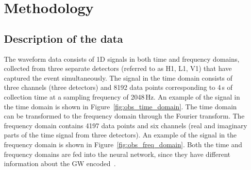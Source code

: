 \section{Methodology}
\label{sec:methodology}


\subsection{Description of the data}

The waveform data consists of 1D signals in both time and frequency domains, collected from three separate detectors (referred to as H1, L1, V1) that have captured the event simultaneously. The signal in the time domain consists of three channels (three detectors) and 8192 data points corresponding to 4\,s of collection time at a sampling frequency of 2048\,Hz. An example of the signal in the time domain is shown in Figure~\ref{fig:obs_time_domain}. The time domain can be transformed to the frequency domain through the Fourier transform. The frequency domain contains 4197 data points and six channels (real and imaginary parts of the time signal from three detectors). An example of the signal in the frequency domain is shown in Figure~\ref{fig:obs_freq_domain}. Both the time and frequency domains are fed into the neural network, since they have different information about the GW encoded~\cite{bhardwaj2023peregrine}. 

